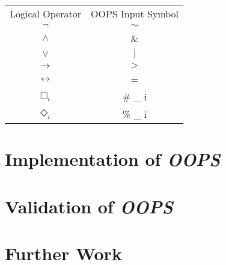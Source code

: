 \documentclass[11pt,a4paper]{article}
\begin{document}
\begin{tabular}{cc}
Logical Operator & OOPS Input Symbol \\
$\neg$ & $\sim$ \\ 
$\wedge$ & \& \\
$\vee$ & $|$ \\
$\rightarrow$ & $>$ \\
$\leftrightarrow$ & = \\
$\Box_i$ & \# \_ i  \\
$\Diamond_i$ & \% \_ i  \\
\end{tabular}

\section{Implementation of {\it OOPS}}
\label{imp}


\section{Validation of {\it OOPS}}
\label{val}

\section{Further Work}
\label{more}



\newpage


\end{document}
